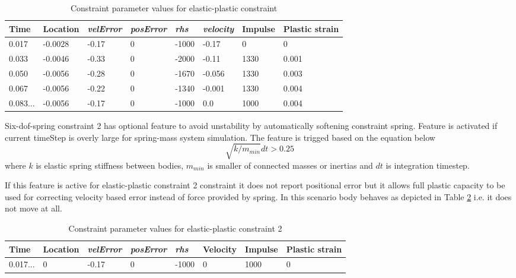 \begin {table}[htb!]
\caption {Constraint parameter values for elastic-plastic constraint} 
\label{tab:epBlockValues} 
\begin{center}
\begin{tabular}{|l|l| l| l|l|l|l|l|}
\hline
{\bf Time} & 
{\bf Location} &
{\it velError} & {\it posError} & {\it rhs} &
{\it velocity} & 
{\bf Impulse} & 
{\bf Plastic strain} \\  \hline
0.017 & -0.0028 &-0.17 & 0 & -1000 & -0.17 & 0 & 0 \\  \hline
0.033 & -0.0046 &-0.33 & 0 & -2000 & -0.11 &  1330 & 0.001 \\  \hline
0.050 & -0.0056 &-0.28 & 0 & -1670 & -0.056 &  1330 & 0.003 \\  \hline
0.067 & -0.0056 &-0.22 & 0 & -1340 &  -0.001&  1330 & 0.004\\  \hline
0.083... & -0.0056  & -0.17 & 0 & -1000 &  0.0&  1000 & 0.004\\  \hline
\end {tabular}
\end{center}
\end {table}

Six-dof-spring constraint 2 has optional feature to avoid unstability by automatically softening constraint
spring. Feature is activated if current timeStep is overly large for spring-mass system simulation.
The feature is trigged based on the equation below 
\begin{equation} \label{eq:frequencyLimited}
\sqrt{ k /  m_{min}} dt > 0.25 
\end{equation}
where $k$ is elastic spring stiffness between bodies,
$m_{min}$ is smaller of connected masses or inertias and $dt$ is integration timestep.

If this feature is active for elastic-plastic constraint 2 constraint  
it does not report positional error but it allows full plastic capacity to be used for correcting
velocity based error instead of force provided by spring.
In this scenario body behaves as depicted in Table \ref{tab:ep2BlockValues} i.e. it does not move at all.

\begin {table}[htb!]
\caption {Constraint parameter values for elastic-plastic constraint 2} 
\label{tab:ep2BlockValues} 
\begin{center}
\begin{tabular}{|l|l| l| l|l|l|l|l|}
\hline
{\bf Time} & 
{\bf Location} &
{\it velError} & {\it posError} & {\it rhs} &
{\bf Velocity} & 
{\bf Impulse} & 
{\bf Plastic strain} \\  \hline
0.017... &  0 & -0.17  & 0 & -1000 & 0       & 1000 & 0 \\  \hline
\end {tabular}
\end{center}
\end {table}

